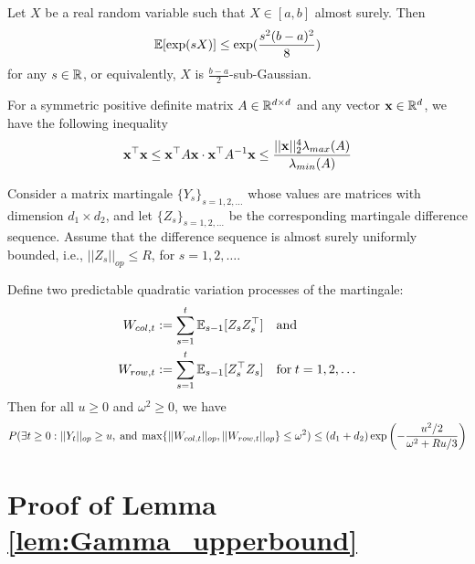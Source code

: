 \begin{lemma} \label{lem:bounded_rv}
Let $X$ be a real random variable such that $X \in [a,b]$ almost surely. Then $$\mathbb{E}[\exp(s X)]\leq \exp( \frac{s^{2}(b-a)^{2}}{8})$$ for any $s \in \mathbb{R}$, or equivalently, $X$ is $\frac{b-a}{2}$-sub-Gaussian.
\end{lemma}

\begin{lemma} \label{lem:quadratic_product} 
For a symmetric positive definite matrix $A\in \mathbb{R}^{d \times d}$ and any vector $\mathbf{x}\in \mathbb{R}^{d}$, we have the following inequality
\begin{align*}
    \mathbf{x}^{\top} \mathbf{x}\leq \mathbf{x}^{\top} A \mathbf{x} \cdot \mathbf{x}^{\top} A^{-1} \mathbf{x} \leq \frac{||\mathbf{x}||_{2}^{4}\lambda_{max}(A)}{\lambda_{min}(A)}
\end{align*}
\end{lemma}

\begin{lemma} \label{lem:freedman}
Consider a matrix martingale $\{Y_{s}\}_{s=1,2,\dots}$ whose values are matrices with dimension $d_{1} \times d_{2}$, and let $\{Z_{s}\}_{s=1,2,\dots}$ be the corresponding martingale difference sequence. Assume that the difference sequence is almost surely uniformly bounded, i.e., $||Z_{s}||_{op} \leq R$, for $s=1,2,\dots$. 

Define two predictable quadratic variation processes of the martingale:
\begin{align*}
    W_{col,t} & := \sum_{s=1}^{t} \mathbb{E}_{s-1}[Z_{s} Z_{s}^{\top}] \quad \text{and} \\
    W_{row,t} & := \sum_{s=1}^{t} \mathbb{E}_{s-1}[Z_{s}^{\top} Z_{s}] \quad \text{for} \hspace{0.25em} t=1,2,\dots
\end{align*}
Then for all $u \geq 0$ and $\omega^{2} \geq 0$, we have
\small
\begin{align*}
    P(\exists t \geq 0: ||Y_{t}||_{op}\geq u, \hspace{0.25em} \text{and} \hspace{0.25em} \max\{||W_{col,t}||_{op}, ||W_{row,t}||_{op}\} \leq \omega^{2}) \leq (d_{1}+d_{2}) \exp{\left(-\frac{u^{2}/2}{\omega^{2}+R u/3}\right)}
\end{align*}
\normalsize
\end{lemma}


\section{Proof of Lemma \ref{lem:Gamma_upperbound}}

